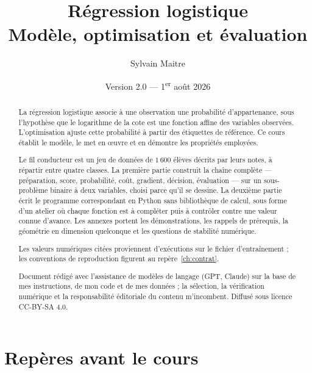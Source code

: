 \documentclass[11pt,a4paper,openany]{report}
\title{\textbf{Régression logistique}\\
  \large Modèle, optimisation et évaluation}
\author{Sylvain Maitre}
\date{Version 2.0 --- 1\textsuperscript{er} août 2026}
\begin{document}
\hypersetup{pageanchor=false}
\maketitle
{}

\begin{abstract}
La régression logistique associe à une observation une probabilité
d'appartenance, sous l'hypothèse que le logarithme de la cote est une fonction
affine des variables observées. L'optimisation ajuste cette probabilité à partir
des étiquettes de référence. Ce cours établit le modèle, le met en {\oe}uvre et
en démontre les propriétés employées.

Le fil conducteur est un jeu de données de $1\,600$ élèves décrits par leurs
notes, à répartir entre quatre classes. La première partie construit la chaîne
complète --- préparation, score, probabilité, coût, gradient, décision,
évaluation --- sur un sous-problème binaire à deux variables, choisi parce qu'il
se dessine. La deuxième partie écrit le programme correspondant en Python sans
bibliothèque de calcul, sous forme d'un atelier où chaque fonction est à
compléter puis à contrôler contre une valeur connue d'avance. Les annexes
portent les démonstrations, les rappels de prérequis, la géométrie en dimension
quelconque et les questions de stabilité numérique.

Les valeurs numériques citées proviennent d'exécutions sur le fichier
d'entraînement ; les conventions de reproduction figurent au
repère~\ref{ch:contrat}.

Document rédigé avec l'assistance de modèles de langage (GPT, Claude) sur la base
de mes instructions, de mon code et de mes données ; la sélection, la
vérification numérique et la responsabilité éditoriale du contenu m'incombent.
Diffusé sous licence CC-BY-SA 4.0.
\end{abstract}

\tableofcontents
\clearpage
{}
\hypersetup{pageanchor=true}

\renewcommand{\chaptername}{Repère}
\renewcommand{\thechapter}{\Roman{chapter}}
\renewcommand{\theHchapter}{repere.\arabic{chapter}}
\part*{Repères avant le cours}


\end{document}
